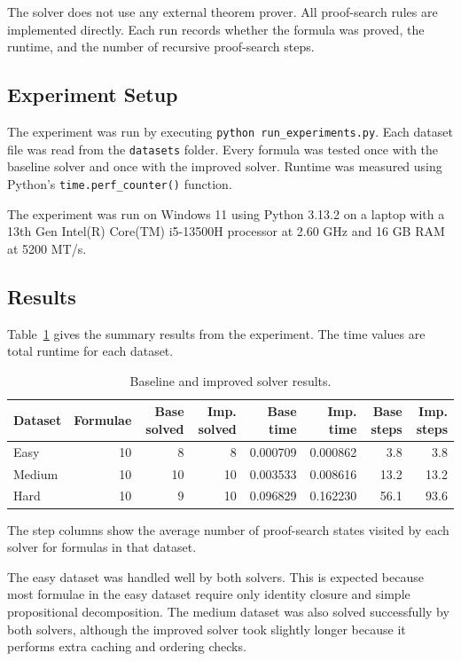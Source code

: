 \documentclass[runningheads]{llncs}
\begin{document}
The solver does not use any external theorem prover. All proof-search rules are implemented directly. Each run records whether the formula was proved, the runtime, and the number of recursive proof-search steps.

\subsection{Experiment Setup}

The experiment was run by executing \texttt{python run\_experiments.py}. Each dataset file was read from the \texttt{datasets} folder. Every formula was tested once with the baseline solver and once with the improved solver. Runtime was measured using Python's \texttt{time.perf\_counter()} function.

The experiment was run on Windows 11 using Python 3.13.2 on a laptop with a 13th Gen Intel(R) Core(TM) i5-13500H processor at 2.60 GHz and 16 GB RAM at 5200 MT/s.

\subsection{Results}

Table~\ref{tab:results} gives the summary results from the experiment. The time values are total runtime for each dataset.

\begin{table}
\caption{Baseline and improved solver results.}
\label{tab:results}
\centering
\begin{tabular}{lrrrrrrr}
\hline
Dataset & Formulae & Base solved & Imp. solved & Base time & Imp. time & Base steps & Imp. steps\\
\hline
Easy & 10 & 8 & 8 & 0.000709 & 0.000862 & 3.8 & 3.8\\
Medium & 10 & 10 & 10 & 0.003533 & 0.008616 & 13.2 & 13.2\\
Hard & 10 & 9 & 10 & 0.096829 & 0.162230 & 56.1 & 93.6\\
\hline
\end{tabular}
\end{table}
The step columns show the average number of proof-search states visited by each solver for formulas in that dataset.


The easy dataset was handled well by both solvers. This is expected because most formulae in the easy dataset require only identity closure and simple propositional decomposition. The medium dataset was also solved successfully by both solvers, although the improved solver took slightly longer because it performs extra caching and ordering checks.
\end{document}
